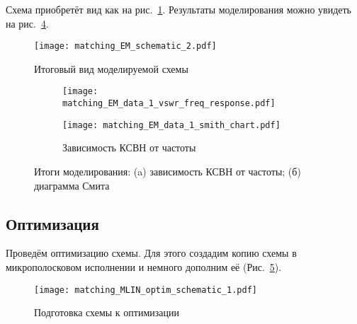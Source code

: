 Схема приобретёт вид как на рис.~\ref{fig:matching_EM_schematic_2}. Результаты моделирования можно увидеть на рис.~\ref{fig:matching_EM_data_1}.
\begin{figure}[!ht]
    \centering
    \texttt{[image: matching\_EM\_schematic\_2.pdf]}
    \caption{Итоговый вид моделируемой схемы}%
    \label{fig:matching_EM_schematic_2}
\end{figure}
\begin{figure}[!ht]
    \centering
    \begin{subfigure}[b]{0.55\textwidth}
        \centering
        \texttt{[image: matching\_EM\_data\_1\_vswr\_freq\_response.pdf]}
        \caption{}%
    \label{fig:matching_EM_data_1_vswr_freq_response}
    \end{subfigure}
    \hfill
    \begin{subfigure}[b]{0.35\textwidth}
        \centering
        \texttt{[image: matching\_EM\_data\_1\_smith\_chart.pdf]}
        \caption{Зависимость КСВН от частоты}%
    \label{fig:matching_EM_data_1_smith_chart}
    \end{subfigure}
    \caption{%
        Итоги моделирования:
        (a) зависимость КСВН от частоты;
        (б) диаграмма Смита
    }%
    \label{fig:matching_EM_data_1}
\end{figure}

\subsection{Оптимизация}

Проведём оптимизацию схемы. Для этого создадим копию схемы в микрополосковом исполнении и немного дополним её (Рис.~\ref{fig:matching_MLIN_optim_schematic_1}).

\begin{figure}
    \centering
    \texttt{[image: matching\_MLIN\_optim\_schematic\_1.pdf]}
    \caption{Подготовка схемы к оптимизации}%
    \label{fig:matching_MLIN_optim_schematic_1}
\end{figure}
